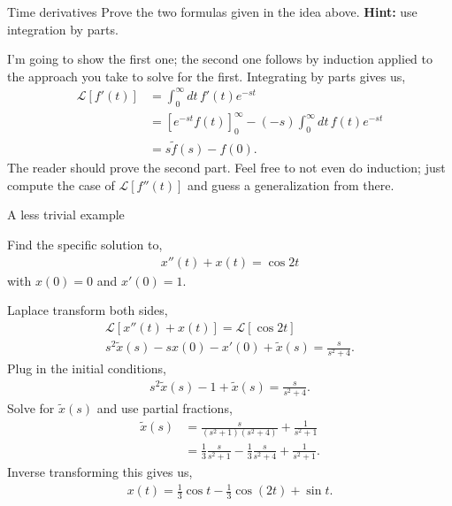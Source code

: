 \documentclass[11pt]{article}
\theoremstyle{mystyle}
\begin{document}
\begin{psexample}{Time derivatives}{}
        Prove the two formulas given in the idea above. \textbf{Hint:} use
        integration by parts.
\end{psexample}
    \begin{pssolution}{}{}
        I'm going to show the first one; the second one follows
        by induction applied to the approach you take to solve
        for the first. Integrating by parts gives us,
        \begin{align*}
            \mathcal{L}[f'(t)] & = \int_0^\infty dt \, f'(t) e^{-st}\\
            & = [e^{-st} f(t) ]_0^\infty - (-s) \int_0^\infty dt \, f(t) e^{-st}\\
            & = s\tilde{f}(s) - f(0).
        \end{align*}
        The reader should prove the second part. Feel free to
        not even do induction; just compute the case of $\mathcal{L}[f''(t)]$
        and guess a generalization from there.
    \end{pssolution}

\begin{psexample}{A less trivial example}{}
    \begin{hwproblem}
        Find the specific solution to,
        \begin{align*}
            x''(t) + x(t) = \cos{2t}
        \end{align*}
        with $x(0) = 0$ and $x'(0) = 1$.
    \end{hwproblem}   
\end{psexample}

\begin{pssolution}{}{}
    Laplace transform both sides,
    \begin{align*}
       \mathcal{L}[x''(t) + x(t)] = \mathcal{L}[\cos{2t}]\\
       s^2 \tilde{x}(s) - sx(0) - x'(0) + \tilde{x}(s) = \frac{s}{s^2 + 4}.
    \end{align*}
    Plug in the initial conditions,
    \begin{align*}
        s^2 \tilde{x}(s) - 1 + \tilde{x}(s) = \frac{s}{s^2 + 4}.
    \end{align*}
    Solve for $\tilde{x}(s)$ and use partial fractions,
    \begin{align*} 
        \tilde{x}(s) & = \frac{s}{(s^2 + 1)(s^2 + 4)} + \frac{1}{s^2 + 1}\\
        & = \frac{1}{3} \frac{s}{s^2 + 1} - \frac{1}{3}\frac{s}{s^2 + 4} + \frac{1}{s^2 + 1}.
    \end{align*}
    Inverse transforming this gives us,
    \begin{align*}
        x(t) = \frac{1}{3}\cos{t} - \frac{1}{3} \cos{(2t)} + \sin{t}.
    \end{align*}
\end{pssolution}
\end{document}
